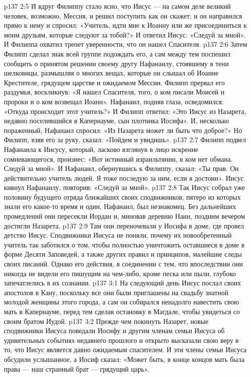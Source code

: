 \vs p137 2:5 И вдруг Филиппу стало ясно, что Иисус --- на самом деле великий человек, возможно, Мессия, и решил поступить как он скажет; и он направился прямо к нему и спросил: «Учитель, идти мне к Иоанну или же присоединиться к моим друзьям, которые следуют за тобой?» И ответил Иисус: «Следуй за мной». И Филиппа охватил трепет уверенности, что он нашел Спасителя.
\vs p137 2:6 \pc Затем Филипп сделал знак всей группе подождать его, а сам между тем поспешил сообщить о принятом решении своему другу Нафанаилу, стоявшему в тени шелковицы, размышляя о многих вещах, которые он слышал об Иоанне Крестителе, грядущем царстве и ожидаемом Мессии. Филипп прервал его раздумья, воскликнув: «Я нашел Спасителя, того, о ком писали Моисей и пророки и о ком возвещал Иоанн». Нафанаил, подняв глаза, осведомился: «Откуда происходит этот учитель?» И Филипп ответил: «Это Иисус из Назарета, недавно поселившийся в Капернауме, сын плотника Иосифа». И, несколько пораженный, Нафанаил спросил: «Из Назарета может ли быть что доброе?» Но Филипп, взяв его за руку, сказал: «Пойдем и увидишь».
\vs p137 2:7 Филипп подвел Нафанаила к Иисусу, который, ласково взглянув в лицо искренне сомневающегося, произнес: «Вот истинный израильтянин, в ком нет обмана. Следуй за мной». И Нафанаил, обернувшись к Филиппу, сказал: «Ты прав. Он действительно учитель людей. Я тоже последую за ним, если я достоин». Иисус кивнул Нафанаилу, повторив: «Следуй за мной».
\vs p137 2:8 \pc Так Иисус собрал уже половину будущего отряда ближайших своих сподвижников, пятеро из которых знали его какое\hyp{}то время и один, Нафанаил, был незнакомец. Без дальнейших промедлений они пересекли Иордан и, миновав деревню Наин, поздним вечером достигли Назарета.
\vs p137 2:9 Там они переночевали у Иосифа в доме, где провел детство Иисус. Сподвижники Иисуса не поняли, почему их новообретенный учитель так заботился о том, чтобы полностью уничтожить оставшиеся в доме в форме Десяти Заповедей, а также других правил и принципов, малейшие следы своих писаний. Однако его действия, в соединении с тем, что впоследствии они никогда не видели его пишущим на чем\hyp{}либо, кроме песка или пыли, глубоко запечатлелись в их сознании.
\vs p137 3:1 На следующий день Иисус послал своих апостолов в Кану, поскольку все они были приглашены на свадьбу знатной молодой женщины этого города, а сам он собирался ненадолго навестить свою мать в Капернауме, перед тем сделав остановку в Магдале, чтобы увидеться со своим братом Иудой.
\vs p137 3:2 Прежде чем покинуть Назарет, новые сподвижники Иисуса поведали Иосифу и другим членам семьи Иисуса об удивительных событиях недавнего прошлого и открыто высказали свою веру в то, что Иисус является давно ожидаемым спасителем. И эти члены семьи Иисуса обсудили услышанное, а Иосиф сказал: «Может быть, в конце концов мать была права --- наш странный брат --- грядущий царь».
